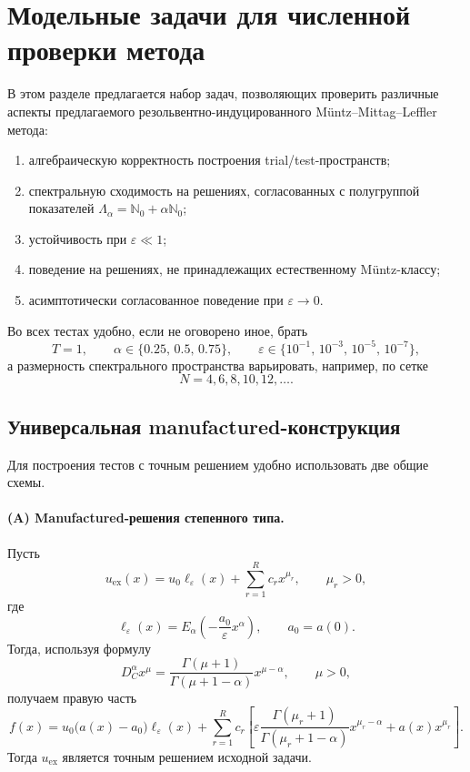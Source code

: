\documentclass[12pt,a4paper]{article}
\theoremstyle{definition}
\newcommand{\eps}{\varepsilon}
\newcommand{\Nc}{\mathbb{N}_0}
\newcommand{\Dc}{D_C^\alpha}
\begin{document}
\section{Модельные задачи для численной проверки метода}
\label{sec:tests}

В этом разделе предлагается набор задач, позволяющих проверить различные аспекты
предлагаемого резольвентно-индуцированного Müntz--Mittag--Leffler метода:
\begin{enumerate}[label=\textup{(\roman*)}]
\item алгебраическую корректность построения trial/test-пространств;
\item спектральную сходимость на решениях, согласованных с полугруппой показателей
$\Lambda_\alpha=\Nc+\alpha\Nc$;
\item устойчивость при $\eps\ll 1$;
\item поведение на решениях, не принадлежащих естественному Müntz-классу;
\item асимптотически согласованное поведение при $\eps\to0$.
\end{enumerate}

Во всех тестах удобно, если не оговорено иное, брать
\[
T=1,\qquad
\alpha\in\{0.25,\,0.5,\,0.75\},\qquad
\eps\in\{10^{-1},\,10^{-3},\,10^{-5},\,10^{-7}\},
\]
а размерность спектрального пространства варьировать, например, по сетке
\[
N=4,6,8,10,12,\dots.
\]

\subsection{Универсальная manufactured-конструкция}

Для построения тестов с точным решением удобно использовать две общие схемы.

\paragraph{(A) Manufactured-решения степенного типа.}
Пусть
\begin{equation}
\label{eq:test-manufactured-power}
u_{\mathrm{ex}}(x)
=
u_0\ell_\eps(x)+\sum_{r=1}^R c_r x^{\mu_r},
\qquad
\mu_r>0,
\end{equation}
где
\[
\ell_\eps(x)=E_\alpha\!\left(-\frac{a_0}{\eps}x^\alpha\right),
\qquad
a_0=a(0).
\]
Тогда, используя формулу
\[
\Dc x^\mu
=
\frac{\Gamma(\mu+1)}{\Gamma(\mu+1-\alpha)}x^{\mu-\alpha},
\qquad \mu>0,
\]
получаем правую часть
\begin{equation}
\label{eq:test-manufactured-force}
f(x)
=
u_0\bigl(a(x)-a_0\bigr)\ell_\eps(x)
+
\sum_{r=1}^R c_r
\left[
\eps \frac{\Gamma(\mu_r+1)}{\Gamma(\mu_r+1-\alpha)}x^{\mu_r-\alpha}
+
a(x)x^{\mu_r}
\right].
\end{equation}
Тогда $u_{\mathrm{ex}}$ является точным решением исходной задачи.
\end{document}
